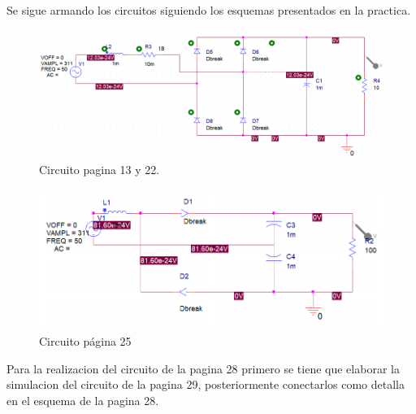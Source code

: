 \documentclass[letterpaper]{article}
\begin{document}
\begin{large}
        Se sigue armando los circuitos siguiendo los esquemas presentados en la practica.
        \begin{figure}
            \centering
            \includegraphics[scale=0.5]{cirp13y22.png}
            \caption{Circuito pagina 13 y 22.}
            \label{fig:Cir13y24}
        \end{figure}\newpage
        \begin{figure}[htbp]
            \centering
            \includegraphics[scale=0.8]{cirp25.png}
            \caption{Circuito página 25}
            \label{fig:Cirp25}
        \end{figure}\newpage
        Para la realizacion del circuito de la pagina 28 primero se tiene que elaborar la simulacion del circuito de la pagina 29, posteriormente conectarlos como detalla en el esquema de la pagina 28.
        \begin{figure}[htbp]
            \centering

\end{figure}
\end{large}
\end{document}

